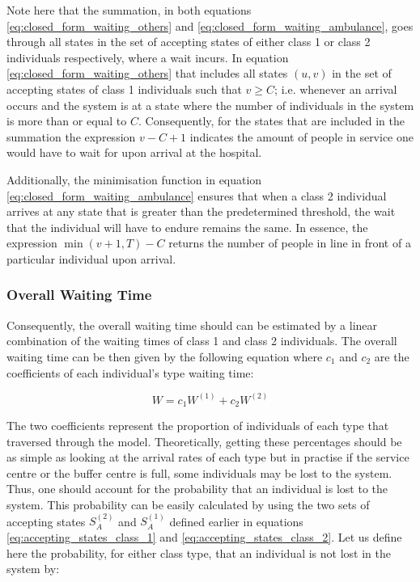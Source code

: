 Note here that the summation, in both equations \ref{eq:closed_form_waiting_others} 
and \ref{eq:closed_form_waiting_ambulance}, goes through all states in the set of 
accepting 
states of either class 1 or class 2 individuals respectively, where a wait 
incurs. 
In equation \ref{eq:closed_form_waiting_others} that includes all states \((u,v)\) 
in the set of accepting states of class 1 individuals such that \( v \geq C\); i.e. 
whenever an arrival occurs and the system is at a state where the number of individuals 
in the system is more than or equal to $C$. 
Consequently, for the states that are included in the summation the expression 
\( v-C+1 \) indicates the amount of people in service one would have to wait for 
upon arrival at the hospital.

Additionally, the minimisation function in equation 
\ref{eq:closed_form_waiting_ambulance} 
ensures that when a class 2 individual arrives at any state 
that is greater than the predetermined threshold, the wait that the individual will 
have to endure remains the same. 
In essence, the expression \(\min(v+1,T) - C\) returns the number of people in line 
in front of a particular individual upon arrival.


\subsubsection{Overall Waiting Time}

Consequently, the overall waiting time should can be estimated by a linear combination 
of the waiting times of class 1 and class 2 individuals. 
The overall waiting time can be then given by the following equation where \(c_1\) 
and \(c_2\) are the coefficients of each individual's type waiting time:

\begin{equation}\label{eq:overall_waiting_time_coeff}
    W = c_1 W^{(1)} + c_2 W^{(2)}
\end{equation}

The two coefficients represent the proportion of individuals of each type that 
traversed through the model. 
Theoretically, getting these percentages should be as simple as looking at the arrival 
rates of each type but in practise if the service centre or the buffer centre 
is full, some individuals may be lost to the system. 
Thus, one should account for the probability that an individual is lost to the system. 
This probability can be easily calculated by using the two sets of accepting states 
\(S_A^{(2)}\) and \(S_A^{(1)}\) defined earlier in equations 
\ref{eq:accepting_states_class_1} 
and \ref{eq:accepting_states_class_2}. 
Let us define here the probability, for either class type, that an individual 
is not lost in the system by:

